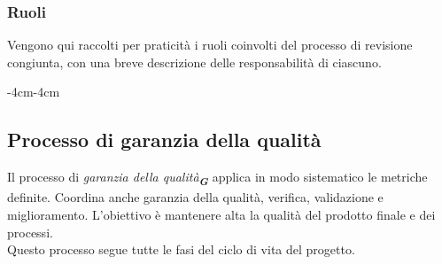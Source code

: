 \documentclass[a4paper,12pt]{article}
\newcommand{\glossario}[1]{\textit{#1}\textsubscript{\textbf{\textit{\textcolor{lightblack}{G}}}}}
\begin{document}
\subsubsection{Ruoli}
Vengono qui raccolti per praticità i ruoli coinvolti del processo di revisione
congiunta, con una breve descrizione delle responsabilità di ciascuno.

\begin{table}[H]
    \begin{adjustwidth}{-4cm}{-4cm}
        \centering
    \end{adjustwidth}
\end{table}

\subsection{Processo di garanzia della qualità}\label{gestione_qualita}
Il processo di \glossario{garanzia della qualità} applica in modo sistematico le metriche definite. Coordina anche garanzia della qualità, verifica, validazione e miglioramento. L'obiettivo è mantenere alta la qualità del prodotto finale e dei processi. \\Questo processo segue tutte le fasi del ciclo di vita del progetto.
\end{document}
